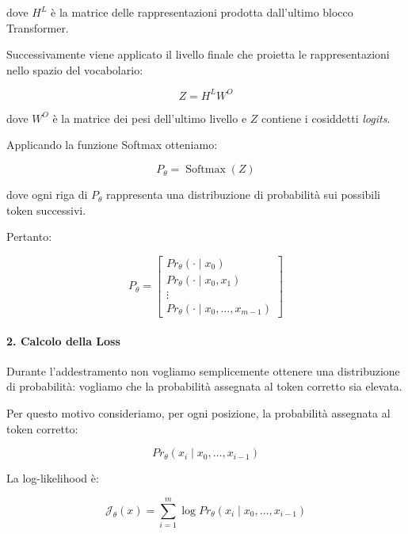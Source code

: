 dove $H^L$ è la matrice delle rappresentazioni prodotta dall'ultimo
blocco Transformer.

Successivamente viene applicato il livello finale che proietta le
rappresentazioni nello spazio del vocabolario:

\begin{equation}
Z = H^L W^O
\end{equation}

dove $W^O$ è la matrice dei pesi dell'ultimo livello e $Z$ contiene
i cosiddetti \textit{logits}.

Applicando la funzione Softmax otteniamo:

\begin{equation}
P_\theta = \operatorname{Softmax}(Z)
\end{equation}

dove ogni riga di $P_\theta$ rappresenta una distribuzione di
probabilità sui possibili token successivi.

Pertanto:

\begin{equation}
P_\theta =
\begin{bmatrix}
Pr_\theta(\cdot \mid x_0) \\
Pr_\theta(\cdot \mid x_0,x_1) \\
\vdots \\
Pr_\theta(\cdot \mid x_0,\dots,x_{m-1})
\end{bmatrix}
\end{equation}

\paragraph{2. Calcolo della Loss}

Durante l'addestramento non vogliamo semplicemente ottenere una
distribuzione di probabilità: vogliamo che la probabilità assegnata al
token corretto sia elevata.

Per questo motivo consideriamo, per ogni posizione, la probabilità
assegnata al token corretto:

\begin{equation}
Pr_\theta(x_i \mid x_0,\dots,x_{i-1})
\end{equation}

La log-likelihood è:

\begin{equation}
\mathcal{J}_\theta(x)
=
\sum_{i=1}^{m}
\log Pr_\theta(x_i \mid x_0,\dots,x_{i-1})
\end{equation}

